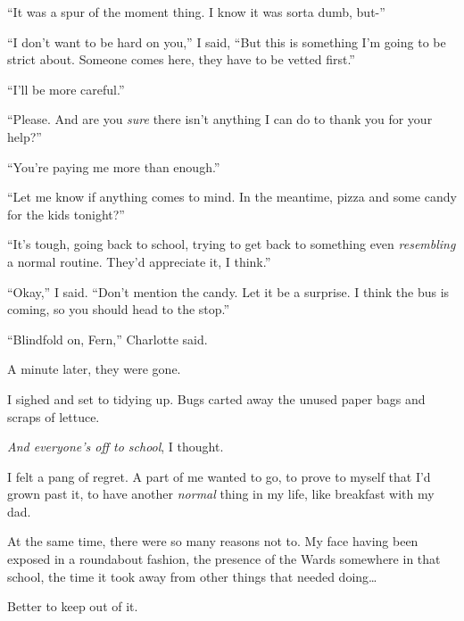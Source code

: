 ``It was a spur of the moment thing.  I know it was sorta dumb, but-''



``I don't want to be hard on you,'' I said, ``But this is something I'm going to be strict about.  Someone comes here, they have to be vetted first.''



``I'll be more careful.''



``Please.  And are you \emph{sure} there isn't anything I can do to thank you for your help?''



``You're paying me more than enough.''



``Let me know if anything comes to mind.  In the meantime, pizza and some candy for the kids tonight?''



``It's tough, going back to school, trying to get back to something even \emph{resembling} a normal routine.  They'd appreciate it, I think.''



``Okay,'' I said.  ``Don't mention the candy.  Let it be a surprise.  I think the bus is coming, so you should head to the stop.''



``Blindfold on, Fern,'' Charlotte said.



A minute later, they were gone.



I sighed and set to tidying up.  Bugs carted away the unused paper bags and scraps of lettuce.



\emph{And everyone's off to school}, I thought.



I felt a pang of regret.  A part of me wanted to go, to prove to myself that I'd grown past it, to have another \emph{normal} thing in my life, like breakfast with my dad.



At the same time, there were so many reasons not to.  My face having been exposed in a roundabout fashion, the presence of the Wards somewhere in that school, the time it took away from other things that needed doing\ldots



Better to keep out of it.



